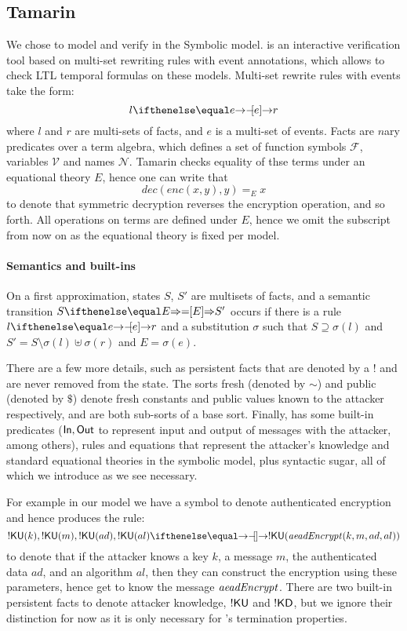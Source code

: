 \subsection{Tamarin}
We chose \mTamarin to model and verify \mEdhoc in the Symbolic model. \mTamarin is an interactive verification tool based on multi-set rewriting rules with event annotations, which allows to check LTL temporal formulas on these models.
Multi-set rewrite rules with events take the form:
\[ l \ifarrow[e] r \]
where $l$ and $r$ are multi-sets of facts, and $e$ is a multi-set of events.
Facts are $n$ary predicates over a term algebra, which defines a set of function symbols $\mathcal F$, variables $\mathcal V$ and names $\mathcal N$. Tamarin checks equality of thse terms under an equational theory $E$, hence one can write that
\[ dec(enc(x,y),y) =_E x \]
to denote that symmetric decryption reverses the encryption operation, and so forth. All operations on terms are defined under $E$, hence we omit the subscript from now on as the equational theory is fixed per model.

\paragraph{Semantics and built-ins} On a first approximation, \mTamarin states $S$, $S'$ are multisets of facts, and a semantic transition $S \semarrow[E] S'$ occurs if there is a rule $l \ifarrow[e] r$ and a substitution $\sigma$ such that $S \supseteq \sigma(l)$ and $S' = S \setminus \sigma(l) \uplus \sigma(r)$ and $E = \sigma(e)$.

There are a few more details, such as persistent facts that are denoted by a $!$ and are never removed from the state.
The sorts fresh (denoted by $\sim$) and public (denoted by $\$$) denote fresh constants and public values known to the attacker respectively, and are both sub-sorts of a base sort.
Finally, \mTamarin has some built-in predicates ($\mathsf{In}, \mathsf{Out}$ to represent input and output of messages with the attacker, among others), rules and equations that represent the attacker's knowledge and standard equational theories in the symbolic model, plus syntactic sugar, all of which we introduce as we see necessary.

For example in our model we have a symbol to denote authenticated encryption and hence \mTamarin produces the rule:
\[ !\mKU( k ), !\mKU( m ), !\mKU( ad ), !\mKU( al )
  \ifarrow !\mKU( \mAeadEncrypt(k, m, ad, al) ) \]
to denote that if the attacker knows a key $k$, a message $m$, the authenticated data $ad$, and an algorithm $al$, then they can construct the encryption using these parameters, hence get to know the message $\mathit{aeadEncrypt}$. There are two built-in persistent facts to denote attacker knowledge, $!\mathsf{KU}$ and $!\mathsf{KD}$, but we ignore their distinction for now as it is only necessary for \mTamarin's termination properties.

